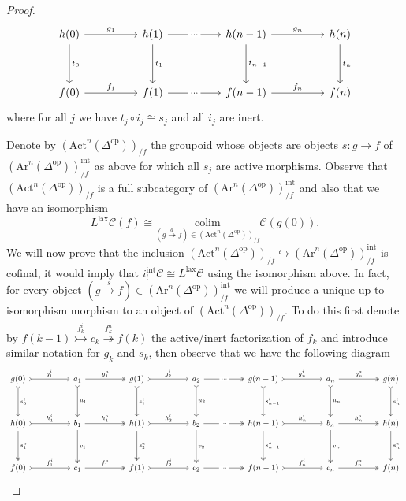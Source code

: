 \documentclass[a4paper, reqno]{amsart}
\theoremstyle{definition}
\newcommand\cC{\mathscr C}
\newcommand\op{\mathrm{op}}
\newcommand\arr{\mathrm{Ar}}
\newcommand\colim{\mathrm{colim}}
\newcommand\lax{\mathrm{lax}}
\newcommand\Act{\mathrm{Act}}
\newcommand\inrt{\mathrm{int}}
\begin{document}
\begin{proof}
\[\begin{tikzcd}[row sep=huge,column sep=huge]
h(0)\arrow[r, "g_1"]\arrow[d, "t_0"]&h(1)\arrow[r, "..." description]\arrow[d, "t_1"]&h(n-1)\arrow[d, "t_{n-1}"]\arrow[r, "g_n"]&h(n)\arrow[d, "t_n"]\\
f(0)\arrow[r, "f_1"]&f(1)\arrow[r, "..." description]&f(n-1)\arrow[r,"f_n"]&f(n)
\end{tikzcd}
\]
where for all $j$ we have $t_j\circ i_j\cong s_j$ and all $i_j$ are inert.\par
Denote by $(\Act^n(\Delta^\op))_{/f}$ the groupoid whose objects are objects $s:g\rightarrow f$ of $(\arr^n(\Delta^\op))^\inrt_{/f}$ as above for which all $s_j$ are active morphisms. Observe that $(\Act^n(\Delta^\op))_{/f}$ is a full subcategory of $(\arr^n(\Delta^\op))^\inrt_{/f}$ and also that we have an isomorphism
\[L^\lax\cC(f)\cong \underset{(g\overset{a}{\twoheadrightarrow}f)\in(\Act^n(\Delta^\op))_{/f}}{\colim}\cC(g(0)).\] 
We will now prove that the inclusion $(\Act^n(\Delta^\op))_{/f}\hookrightarrow(\arr^n(\Delta^\op))^\inrt_{/f}$ is cofinal, it would imply that $i^\inrt_!\cC\cong L^\lax\cC$ using the isomorphism above. In fact, for every object $(g\xrightarrow{s}f)\in(\arr^n(\Delta^\op))^\inrt_{/f}$ we will produce a unique up to isomorphism morphism to an object of $(\Act^n(\Delta^\op))_{/f}$. To do this first denote by $f(k-1)\overset{f^i_k}{\rightarrowtail}c_k\overset{f^a_k}{\twoheadrightarrow}f(k)$ the active/inert factorization of $f_k$ and introduce similar notation for $g_k$ and $s_k$, then observe that we have the following diagram
\[
\begin{tikzcd}[row sep=huge,column sep=huge]
g(0)\arrow[r, tail, "g^i_1"]\arrow[d, tail, "s^i_0"]&a_1\arrow[d, tail, "u_1"]\arrow[r, two heads, "g^a_1"]&g(1)\arrow[r, tail, "g^i_2"]\arrow[d, tail, "s^i_1"]&a_2\arrow[d, tail, "u_2"]\arrow[r, two heads, "..." description]&g(n-1)\arrow[r, tail, "g^i_n"]\arrow[d, tail, "s^i_{n-1}"]&a_n\arrow[d, tail, "u_n"]\arrow[r, two heads, "g^a_n"]&g(n)\arrow[d, tail, "s^i_n"]\\
h(0)\arrow[d, two heads, "s^a_1"]\arrow[r, tail, "h^i_1"]&b_1\arrow[d, two heads, "v_1"]\arrow[r, two heads, "h^a_1"]&h(1)\arrow[d, two heads, "s^a_2"]\arrow[r, tail, "h^i_2"]&b_2\arrow[d, two heads, "v_2"]\arrow[r, two heads, "..." description]&h(n-1)\arrow[d, two heads, "s^a_{n-1}"]\arrow[r, tail, "h^i_{n}"]&b_n\arrow[d, two heads, "v_n"]\arrow[r, two heads, "h^a_n"]&h(n)\arrow[d, "s^a_n"]\\
f(0)\arrow[r, tail, "f^i_1"]&c_1\arrow[r, two heads, "f^a_1"]&f(1)\arrow[r, tail, "f^i_2"]&c_2\arrow[r, two heads, "..." description]&f(n-1)\arrow[r, tail, "f^i_n"]&c_n\arrow[r, two heads, "f^a_n"]&f(n)

\end{tikzcd}\]
\end{proof}
\end{document}
